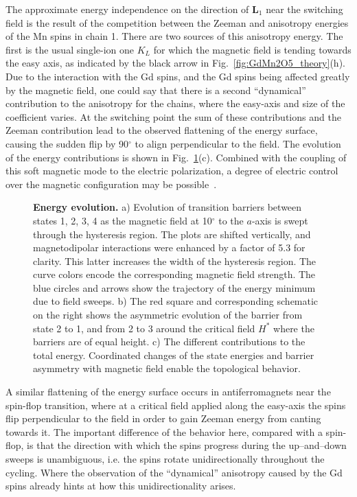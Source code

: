 %
The approximate energy independence on the direction of $\bm{L}_1$ near the switching field is the result of the competition between the Zeeman and anisotropy energies of the Mn spins in chain 1.
There are two sources of this anisotropy energy.
The first is the usual single-ion one $K_L$ for which the magnetic field is tending towards the easy axis, as indicated by the black arrow in Fig.~\ref{fig:GdMn2O5_theory}(h).
Due to the interaction with the Gd spins, and the Gd spins being affected greatly by the magnetic field, one could say that there is a second ``dynamical'' contribution to the anisotropy for the chains, where the easy-axis and size of the coefficient varies.
At the switching point the sum of these contributions and the Zeeman contribution lead to the observed flattening of the energy surface, causing the sudden flip by 90$^\circ$ to align perpendicular to the field.
The evolution of the energy contributions is shown in Fig.~\ref{fig:GdMn2O5_neb}(c).
Combined with the coupling of this soft magnetic mode to the electric polarization, a degree of electric control over the magnetic configuration may be possible~\cite{Oh14}.
%
\begin{figure}[h]
	\begin{subfigure}{\textwidth}
	\end{subfigure}
    \caption{\label{fig:GdMn2O5_neb}{\bf Energy evolution.}
    a) Evolution of transition barriers between states 1, 2, 3, 4 as the magnetic field at 10$^\circ$ to the $a$-axis is swept through the hysteresis region. The plots are shifted vertically, and magnetodipolar interactions were enhanced by a factor of 5.3 for clarity. This latter increases the width of the hysteresis region. The curve colors encode the corresponding magnetic field strength. The blue circles and arrows show the trajectory of the energy minimum due to field sweeps.
    b) The red square and corresponding schematic on the right shows the asymmetric evolution of the barrier from state 2 to 1, and from 2 to 3 around the critical field $H^\ast$ where the barriers are of equal height.
    c) The different contributions to the total energy. 
    Coordinated changes of the state energies and barrier asymmetry with magnetic field enable the topological behavior.
    }
\end{figure}
A similar flattening of the energy surface occurs in antiferromagnets near the spin-flop transition, where at a critical field applied along the easy-axis the spins flip perpendicular to the field in order to gain Zeeman energy from canting towards it.  
The important difference of the behavior here, compared with a spin-flop, is that the direction with which the spins progress during the up--and--down sweeps is unambiguous, i.e. the spins rotate unidirectionally throughout the cycling.
Where the observation of the ``dynamical'' anisotropy caused by the Gd spins already hints at how this unidirectionality arises.

